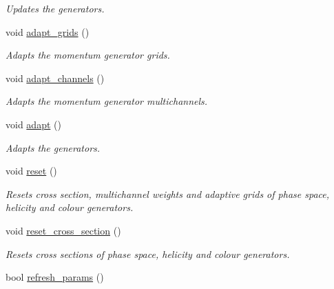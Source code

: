 \begin{DoxyCompactItemize}
\begin{DoxyCompactList}\small\item\em Updates the generators. \end{DoxyCompactList}\item 
\hypertarget{a00436_a4624c85bb2c5a4c720d3944944fff482}{}void \hyperlink{a00436_a4624c85bb2c5a4c720d3944944fff482}{adapt\+\_\+grids} ()\label{a00436_a4624c85bb2c5a4c720d3944944fff482}

\begin{DoxyCompactList}\small\item\em Adapts the momentum generator grids. \end{DoxyCompactList}\item 
\hypertarget{a00436_acb541bb6c5b63fae01ff147f4cd2823f}{}void \hyperlink{a00436_acb541bb6c5b63fae01ff147f4cd2823f}{adapt\+\_\+channels} ()\label{a00436_acb541bb6c5b63fae01ff147f4cd2823f}

\begin{DoxyCompactList}\small\item\em Adapts the momentum generator multichannels. \end{DoxyCompactList}\item 
\hypertarget{a00436_a7f97f414b5f3d689efb551aa4f6b1d1c}{}void \hyperlink{a00436_a7f97f414b5f3d689efb551aa4f6b1d1c}{adapt} ()\label{a00436_a7f97f414b5f3d689efb551aa4f6b1d1c}

\begin{DoxyCompactList}\small\item\em Adapts the generators. \end{DoxyCompactList}\item 
void \hyperlink{a00436_aa2cd6b9887022d49cd48497b8061c54d}{reset} ()
\begin{DoxyCompactList}\small\item\em Resets cross section, multichannel weights and adaptive grids of phase space, helicity and colour generators. \end{DoxyCompactList}\item 
\hypertarget{a00436_a7291d00338eceaefb5b5608625b2bec6}{}void \hyperlink{a00436_a7291d00338eceaefb5b5608625b2bec6}{reset\+\_\+cross\+\_\+section} ()\label{a00436_a7291d00338eceaefb5b5608625b2bec6}

\begin{DoxyCompactList}\small\item\em Resets cross sections of phase space, helicity and colour generators. \end{DoxyCompactList}\item 
\hypertarget{a00436_a097bfddf2a2231b766b93649075372b3}{}bool \hyperlink{a00436_a097bfddf2a2231b766b93649075372b3}{refresh\+\_\+params} ()\label{a00436_a097bfddf2a2231b766b93649075372b3}


\end{DoxyCompactItemize}
